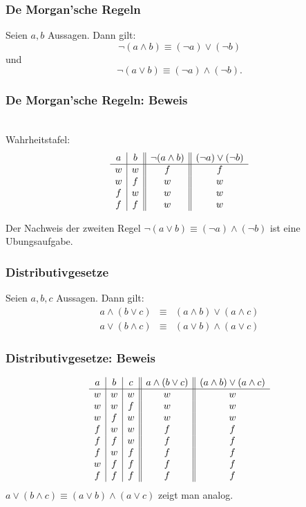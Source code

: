 %
%
\begin{frame}\frametitle{De Morgan'sche Regeln}

	Seien $a,b$ Aussagen.
	Dann gilt:
	$$
		\neg( a\land b) \equiv (\neg a) \lor (\neg b)
	$$
	und 
	$$
		\neg( a\lor b) \equiv (\neg a) \land (\neg b).
	$$
	
\end{frame}
%
%
\begin{frame}\frametitle{De Morgan'sche Regeln: Beweis}

	 \\[3mm]
	
	Wahrheitstafel:
	$$
		\begin{array}{c | c || c || c}
			a	& b	& \neg(a\land b)	& (\neg a) \lor (\neg b)	\\ \hline
			w	& w	& f				& f	\\
			w	& f	& w				& w	\\
			f	& w	& w				& w	\\
			f	& f	& w				& w
		\end{array}
	$$
	
	\vspace{10mm}
	Der Nachweis der zweiten Regel $\neg( a\lor b) \equiv (\neg a) \land (\neg b)$ ist eine Ubungsaufgabe.
	
\end{frame}
%
%
\begin{frame}\frametitle{Distributivgesetze}
	
	Seien $a,b,c$ Aussagen.
	Dann gilt:
	\begin{eqnarray*}
		a\land (b \lor c)	&\equiv& (a\land b) \lor (a\land c)\\
		a\lor (b\land c) 	&\equiv& (a\lor b) \land (a\lor c)
	\end{eqnarray*}
	
\end{frame}
%
%
\begin{frame}\frametitle{Distributivgesetze: Beweis}
	
	
	$$
		\begin{array}{c | c | c || c || c}
			a	& b	&c				&a\land (b \lor c)	& (a\land b) \lor (a\land c)	\\ \hline
			w	& w	& w				&w				& w					\\
			w	& w	&f				&w				& w					\\
			w	& f	&w				&w				& w				 	\\
			f	&w	&w				&f 				&f					\\
			f	&f	&w				&f				&f					\\
			f	&w	&f				&f				&f					\\
			w	&f	&f				&f				&f					\\
			f	&f	&f				&f				&f	
		\end{array}
	$$
	\pause
	\vfill
	$a\lor (b\land c) \equiv (a\lor b) \land (a\lor c)$ zeigt man analog.
	
\end{frame}
